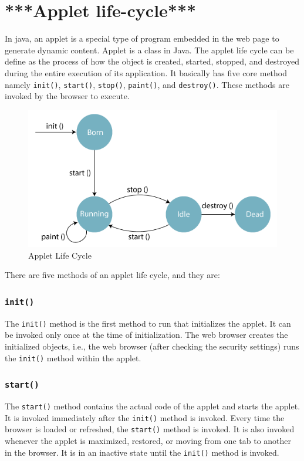 \documentclass[twocolumn, a4paper]{article}
\begin{document}
\section{***Applet life-cycle***}
In java, an applet is a special type of program embedded in the web page to
generate dynamic content. Applet is a class in Java. The applet life cycle can
be define as the process of how the object is created, started, stopped, and
destroyed during the entire execution of its application. It basically has
five core method namely \verb+init()+, \verb+start()+, \verb+stop()+,
\verb+paint()+, and \verb+destroy()+. These methods are invoked by the browser
to execute.

\begin{figure}[ht]
  \centering
  \includegraphics[width=\columnwidth]{appletlc}
  \caption{Applet Life Cycle}
\end{figure}
There are five methods of an applet life cycle, and they are:

\subsubsection{\texttt{init()}}
The \verb+init()+ method is the first method to run that initializes the
applet. It can be invoked only once at the time of initialization. The web
browser creates the initialized objects, i.e., the web browser (after checking
the security settings) runs the \verb+init()+ method within the applet.

\subsubsection{\texttt{start()}}
The \verb+start()+ method contains the actual code of the applet and starts
the applet. It is invoked immediately after the \verb+init()+ method is
invoked. Every time the browser is loaded or refreshed, the \verb+start()+
method is invoked. It is also invoked whenever the applet is maximized,
restored, or moving from one tab to another in the browser. It is in an
inactive state until the \verb+init()+ method is invoked.
\end{document}
